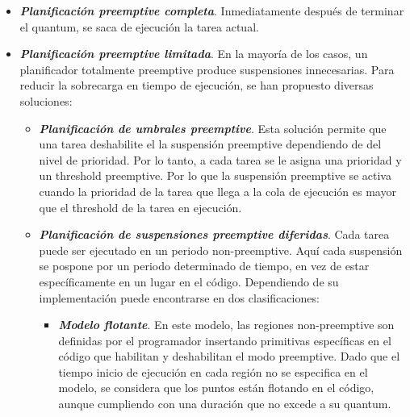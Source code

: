 \begin{itemize}
\item \textbf{\textit{Planificación \gls{preemptive} completa}}. Inmediatamente después de terminar el \gls{quantum}, se saca de ejecución la tarea actual.
\item \textbf{\textit{Planificación \gls{preemptive} limitada}}. En la mayoría de los casos, un planificador totalmente \gls{preemptive} produce suspensiones innecesarias. Para reducir la sobrecarga en tiempo de ejecución, se han propuesto diversas soluciones\cite{Buttazzo2013}:
    \begin{itemize}
    \item \textbf{\textit{Planificación de umbrales \gls{preemptive}}}.
Esta solución permite que una tarea deshabilite el la suspensión \gls{preemptive} dependiendo de del nivel de prioridad. Por lo tanto, a cada tarea se le asigna una prioridad y un \gls{threshold} \gls{preemptive}. Por lo que la suspensión \gls{preemptive} se activa cuando la prioridad de la tarea que llega a la cola de ejecución es mayor que el  \gls{threshold} de la tarea en ejecución.
    \item \textbf{\textit{Planificación de suspensiones \gls{preemptive} diferidas}}.
    Cada tarea puede ser ejecutado en un periodo \gls{non-preemptive}. Aquí cada suspensión se pospone por un periodo determinado de tiempo, en vez de estar específicamente en un lugar en el código. Dependiendo de su implementación puede encontrarse en dos clasificaciones:
        \begin{itemize}
        \item \textbf{\textit{Modelo flotante}}. En este modelo, las regiones \gls{non-preemptive} son definidas por el programador insertando primitivas específicas en el código que habilitan y deshabilitan el modo \gls{preemptive}. Dado que el tiempo inicio de ejecución en cada región no se especifica en el modelo, se considera que los puntos están flotando en el código, aunque cumpliendo con una duración que no excede a su \gls{quantum}.
       

\end{itemize}
\end{itemize}
\end{itemize}
